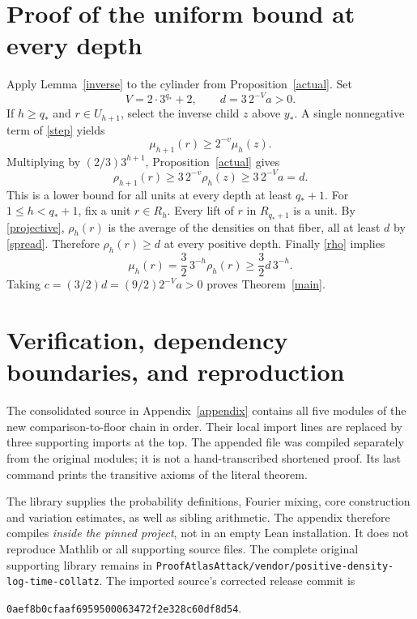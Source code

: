 \documentclass[11pt,a4paper]{article}
\theoremstyle{definition}\newtheorem{definition}[theorem]{Definition}
\theoremstyle{remark}\newtheorem{remark}[theorem]{Remark}
\newcommand{\code}[1]{{\small\nolinkurl{#1}}}
\begin{document}
\section{Proof of the uniform bound at every depth}
Apply Lemma~\ref{inverse} to the cylinder from Proposition~\ref{actual}.
Set
\[
 V=2\cdot3^{q_*}+2,\qquad d=3\,2^{-V}a>0.
\]
If $h\ge q_*$ and $r\in U_{h+1}$, select the inverse child $z$ above
$y_*$. A single nonnegative term of \eqref{step} yields
\[
 \mu_{h+1}(r)\ge2^{-v}\mu_h(z).
\]
Multiplying by $(2/3)3^{h+1}$, Proposition~\ref{actual} gives
\begin{equation}\label{spread}
 \rho_{h+1}(r)\ge3\,2^{-v}\rho_h(z)\ge3\,2^{-V}a=d.
\end{equation}
This is a lower bound for all units at every depth at least $q_*+1$.
For $1\le h<q_*+1$, fix a unit $r\in R_h$. Every lift of $r$ in
$R_{q_*+1}$ is a unit. By \eqref{projective}, $\rho_h(r)$ is the average
of the densities on that fiber, all at least $d$ by \eqref{spread}.
Therefore $\rho_h(r)\ge d$ at every positive depth.
Finally \eqref{rho} implies
\[
 \mu_h(r)=\frac32\,3^{-h}\rho_h(r)\ge\frac32d\,3^{-h}.
\]
Taking $c=(3/2)d=(9/2)2^{-V}a>0$ proves Theorem~\ref{main}.

\section{Verification, dependency boundaries, and reproduction}

The consolidated source in Appendix~\ref{appendix} contains all five
modules of the new comparison-to-floor chain in order. Their local import
lines are replaced by three supporting imports at the top. The appended
file was compiled separately from the original modules; it is not a
hand-transcribed shortened proof. Its last command prints the transitive
axioms of the literal theorem.

The library supplies the probability definitions, Fourier mixing, core
construction and variation estimates, as well as sibling arithmetic.
The appendix therefore compiles \emph{inside the pinned project}, not in
an empty Lean installation. It does not reproduce Mathlib or all supporting
source files. The complete original supporting library remains in
\code{ProofAtlasAttack/vendor/positive-density-log-time-collatz}.
The imported source's corrected release commit is
\begin{center}\small\texttt{0aef8b0cfaaf6959500063472f2e328c60df8d54}.\end{center}
\end{document}
